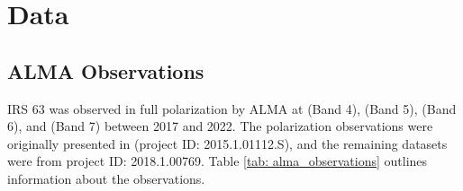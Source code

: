 \chapter{Data}
\label{ch_data}





\section{ALMA Observations}
IRS 63 was observed in full polarization by ALMA at \bfour (Band 4), \bfive (Band 5), \bsix (Band 6), and \bseven (Band 7) between 2017 and 2022. The \bandsixmm polarization observations were originally presented in \cite{sadavoy_dust_2019} (project ID: 2015.1.01112.S), and the remaining datasets were from project ID: 2018.1.00769. Table \ref{tab: alma_observations} outlines information about the observations.

